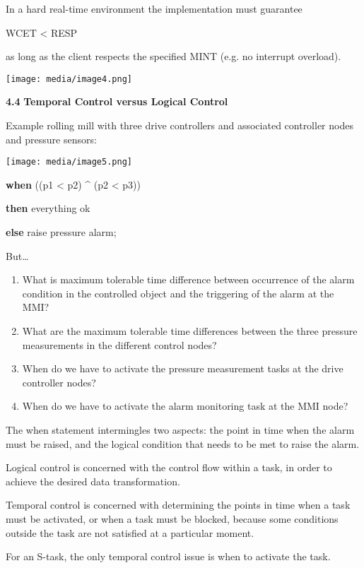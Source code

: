 In a hard real-time environment the implementation must guarantee

WCET \textless{} RESP

as long as the client respects the specified MINT (e.g. no interrupt
overload).

\texttt{[image: media/image4.png]}

\textbf{4.4} \protect\hypertarget{teil5}{}{}\textbf{Temporal Control
versus Logical Control}

Example rolling mill with three drive controllers and associated
controller nodes and pressure sensors:

\texttt{[image: media/image5.png]}

\textbf{when} ((p1 \textless{} p2) \^{} (p2 \textless{} p3))

\textbf{then} everything ok

\textbf{else} raise pressure alarm;

But\ldots{}

\begin{enumerate}
\def\labelenumi{\arabic{enumi}.}
\item
  What is maximum tolerable time difference between occurrence of the
  alarm condition in the controlled object and the triggering of the
  alarm at the MMI?
\item
  What are the maximum tolerable time differences between the three
  pressure measurements in the different control nodes?
\item
  When do we have to activate the pressure measurement tasks at the
  drive controller nodes?
\item
  When do we have to activate the alarm monitoring task at the MMI node?
\end{enumerate}

The when statement intermingles two aspects: the point in time when the
alarm must be raised, and the logical condition that needs to be met to
raise the alarm.

Logical control is concerned with the control flow within a task, in
order to achieve the desired data transformation.

Temporal control is concerned with determining the points in time when a
task must be activated, or when a task must be blocked, because some
conditions outside the task are not satisfied at a particular moment.

For an S-task, the only temporal control issue is when to activate the
task.

